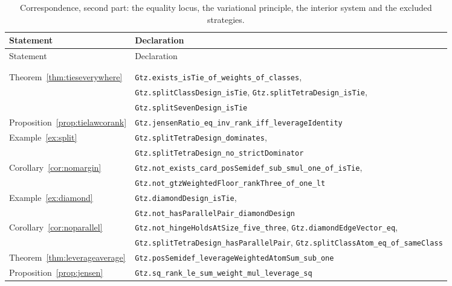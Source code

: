 {\small
\begin{longtable}{@{}ll@{}}
\toprule
Statement & Declaration \\
\midrule
\endfirsthead
\toprule
Statement & Declaration \\
\midrule
\endhead
\endfoot
\bottomrule
\caption{Correspondence, second part: the equality locus, the variational
principle, the interior system and the excluded strategies.}
\label{tab:leantwo}\\
\endlastfoot
\multicolumn{2}{@{}l}{\emph{\S\ref{sec:ties}, the equality locus}}\\
Theorem~\ref{thm:tieseverywhere}& \texttt{Gtz.exists\_isTie\_of\_weights\_of\_classes}, \\
                               & \texttt{Gtz.splitClassDesign\_isTie},
                                 \texttt{Gtz.splitTetraDesign\_isTie}, \\
                               & \texttt{Gtz.splitSevenDesign\_isTie} \\
Proposition~\ref{prop:tielawcorank}
                               & \texttt{Gtz.jensenRatio\_eq\_inv\_rank\_iff\_leverageIdentity} \\
Example~\ref{ex:split}         & \texttt{Gtz.splitTetraDesign\_dominates}, \\
                               & \texttt{Gtz.splitTetraDesign\_no\_strictDominator} \\
Corollary~\ref{cor:nomargin}   & \texttt{Gtz.not\_exists\_card\_posSemidef\_sub\_smul\_one\_of\_isTie}, \\
                               & \texttt{Gtz.not\_gtzWeightedFloor\_rankThree\_of\_one\_lt} \\
Example~\ref{ex:diamond}       & \texttt{Gtz.diamondDesign\_isTie}, \\
                               & \texttt{Gtz.not\_hasParallelPair\_diamondDesign} \\
Corollary~\ref{cor:noparallel} & \texttt{Gtz.not\_hingeHoldsAtSize\_five\_three},
                                 \texttt{Gtz.diamondEdgeVector\_eq}, \\
                               & \texttt{Gtz.splitTetraDesign\_hasParallelPair},
                                 \texttt{Gtz.splitClassAtom\_eq\_of\_sameClass} \\
Theorem~\ref{thm:leverageaverage}
                               & \texttt{Gtz.posSemidef\_leverageWeightedAtomSum\_sub\_one} \\
Proposition~\ref{prop:jensen}  & \texttt{Gtz.sq\_rank\_le\_sum\_weight\_mul\_leverage\_sq} \\

\end{longtable}}

